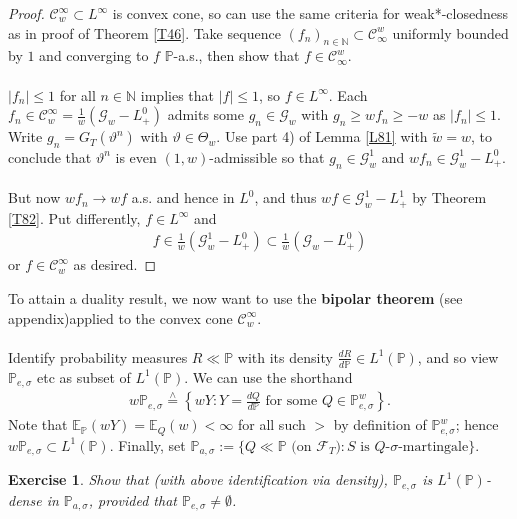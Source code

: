 \documentclass[12pt,a4paper, twoside]{article}
\newtheorem{exe}{Exercise}[section]
\theoremstyle{definition}
\newcommand{\EE}{\mathbb{E}} %
\newcommand{\PP}{\mathbb{P}} %
\newcommand{\teq}{\overset{\wedge}{=}}
\begin{document}
\begin{proof}
$\mathcal{C}_w^\infty \subset L^\infty$ is convex cone, so can use the same criteria for weak*-closedness as in proof of Theorem \ref{T46}. Take sequence $(f_n)_{n \in \mathbb{N}} \subset \mathcal{C}_\infty^w$ uniformly bounded by $1$ and converging to $f$ $\PP$-a.s., then show that $f \in \mathcal{C}_\infty^w$. \\
\\
$|f_n| \leq 1$ for all $n \in \mathbb{N}$ implies that $|f| \leq 1$, so $f \in L^\infty$. Each $f_n \in \mathcal{C}_w^\infty = \frac{1}{w}( \mathcal{G}_w-L_+^0)$ admits some $g_n \in \mathcal{G}_w$ with $g_n \geq wf_n \geq -w$ as $|f_n| \leq 1$. Write $g_n = G_T( \vartheta^n)$ with $\vartheta \in \Theta_w$. Use part 4) of Lemma \ref{L81} with $\widetilde{w}=w$, to conclude that $\vartheta^n$ is even $(1,w)$-admissible so that $g_n \in \mathcal{G}_w^1$ and $wf_n \in \mathcal{G}_w^1-L_+^0$. \\
\\
But now $wf_n \to wf$ a.s. and hence in $L^0$, and thus $wf \in \mathcal{G}_w^1-L_+^1$ by Theorem \ref{T82}. Put differently,  $f \in L^\infty$ and 
\begin{align*}
f \in \frac{1}{w}( \mathcal{G}_w^1- L_+^0) \subset \frac{1}{w}( \mathcal{G}_w-L_+^0)
\end{align*}
or $f \in \mathcal{C}_w^\infty$ as desired. 
\end{proof}
To attain a duality result, we now want to use the \textbf{bipolar theorem} (see appendix)applied to the convex cone $\mathcal{C}_w^\infty$. \\
\\
Identify probability measures $R \ll \PP$ with its density $\frac{dR}{d\PP} \in L^1(\PP)$, and so view $\PP_{e, \sigma}$ etc as subset of $L^1( \PP)$. We can use the shorthand 
\begin{align*}
w \PP_{e, \sigma} \teq \left\{ wY : Y = \frac{dQ}{d\PP} \text{ for some } Q \in \PP_{e, \sigma}^w\right\}.
\end{align*} 
Note that $\EE_\PP(wY)= \EE_Q(w) < \infty$ for all such $>$ by definition of $\PP_{e, \sigma}^w$; hence $w \PP_{e, \sigma} \subset L^1 ( \PP)$. Finally, set $\PP_{a, \sigma}:= \{ Q \ll \PP \text{ (on $\mathcal{F}_T$)} : S \text{ is $Q$-$\sigma$-martingale}\}$.
\begin{exe} Show that (with above identification via density), $\PP_{e, \sigma}$ is $L^1(\PP)$-dense in $\PP_{a, \sigma}$, provided that $\PP_{e, \sigma} \neq \emptyset$.
\end{exe} 
\end{document}
